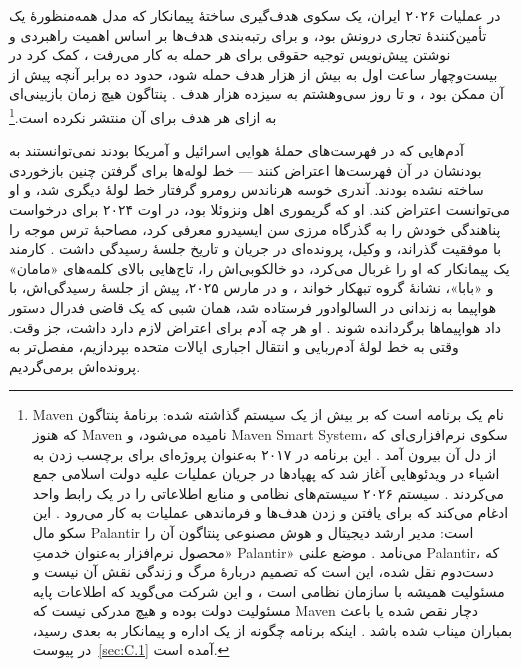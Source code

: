 در عملیات ۲۰۲۶ ایران، یک سکوی هدف‌گیری ساختهٔ پیمانکار که مدل همه‌منظورهٔ یک تأمین‌کنندهٔ تجاری درونش بود، و برای رتبه‌بندی هدف‌ها بر اساس اهمیت راهبردی و نوشتن پیش‌نویس توجیه حقوقی برای هر حمله به کار می‌رفت \autocite{livingstone2026maven}، کمک کرد در بیست‌وچهار ساعت اول به بیش از هزار هدف حمله شود، حدود ده برابر آنچه پیش از آن ممکن بود \autocite{csis2026maven}، و تا روز سی‌وهشتم به سیزده هزار هدف \autocite{breakingdefense2026maven}. پنتاگون هیچ زمان بازبینی‌ای به ازای هر هدف برای آن منتشر نکرده است.\footnote{Maven نام یک برنامه است که بر بیش از یک سیستم گذاشته شده: برنامهٔ پنتاگون که هنوز Maven نامیده می‌شود، و Maven Smart System، سکوی نرم‌افزاری‌ای که از دل آن بیرون آمد \autocite{csis2026maven}. این برنامه در ۲۰۱۷ به‌عنوان پروژه‌ای برای برچسب زدن به اشیاء در ویدئوهایی آغاز شد که پهپادها در جریان عملیات علیه دولت اسلامی جمع می‌کردند \autocite{weisgerber2017maven,fang2019maven}. سیستم ۲۰۲۶ سیستم‌های نظامی و منابع اطلاعاتی را در یک رابط واحد ادغام می‌کند که برای یافتن و زدن هدف‌ها و فرماندهی عملیات به کار می‌رود \autocite{defensescoop2026transition}. این سکو مال Palantir است: مدیر ارشد دیجیتال و هوش مصنوعی پنتاگون آن را «محصول نرم‌افزار به‌عنوان خدمتِ Palantir» می‌نامد \autocite{defensescoop2026transition}. موضع علنی Palantir، که دست‌دوم نقل شده، این است که تصمیم دربارهٔ مرگ و زندگی نقش آن نیست و مسئولیت همیشه با سازمان نظامی است \autocite{lee2026palantir}، و این شرکت می‌گوید که اطلاعات پایه مسئولیت دولت بوده و هیچ مدرکی نیست که Maven دچار نقص شده یا باعث بمباران میناب شده باشد \autocite{Bloomberg2026KillChain}. اینکه برنامه چگونه از یک اداره و پیمانکار به بعدی رسید، در پیوست~\ref{sec:C.1} آمده است.}

آدم‌هایی که در فهرست‌های حملهٔ هوایی اسرائیل و آمریکا بودند نمی‌توانستند به بودنشان در آن فهرست‌ها اعتراض کنند — خط لوله‌ها برای گرفتن چنین بازخوردی ساخته نشده بودند. آندری خوسه هرناندس رومرو گرفتار خط لولهٔ دیگری شد، و او می‌توانست اعتراض کند. او که گریموری اهل ونزوئلا بود، در اوت ۲۰۲۴ برای درخواست پناهندگی خودش را به گذرگاه مرزی سن ایسیدرو معرفی کرد، مصاحبهٔ ترس موجه را با موفقیت گذراند، و وکیل، پرونده‌ای در جریان و تاریخ جلسهٔ رسیدگی داشت \autocite{LULAC2025HernandezRomero,Vega2025HernandezRomero}. کارمند یک پیمانکار که او را غربال می‌کرد، دو خالکوبی‌اش را، تاج‌هایی بالای کلمه‌های «مامان» و «بابا»، نشانهٔ گروه تبهکار خواند \autocite{Palomera2025Blade}، و در مارس ۲۰۲۵، پیش از جلسهٔ رسیدگی‌اش، با هواپیما به زندانی در السالوادور فرستاده شد، همان شبی که یک قاضی فدرال دستور داد هواپیماها برگردانده شوند \autocite{jgg2025contempt}. او هر چه آدم برای اعتراض لازم دارد داشت، جز وقت. وقتی به خط لولهٔ آدم‌ربایی و انتقال اجباری ایالات متحده بپردازیم، مفصل‌تر به پرونده‌اش برمی‌گردیم.

